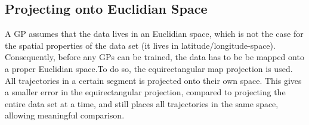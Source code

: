 \subsection{Projecting onto Euclidian Space}\label{projecting-onto-euclidian-space}
A GP assumes that the data lives in an Euclidian
space, which is not the case for the spatial properties of the data set 
(it lives in latitude/longitude-space). Consequently, before any GPs can be trained,
the data has to be be mapped onto a proper Euclidian space.To do so, 
the equirectangular map projection is used. 
All trajectories in a certain segment is projected onto their own
space. This gives a smaller error in the equirectangular projection,
compared to projecting the entire data set at a time, and still
places all trajectories in the same space, allowing 
meaningful comparison.

